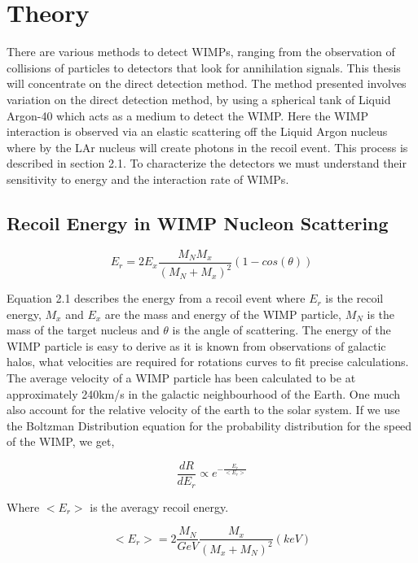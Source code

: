 \documentclass[11pt,a4paper,oneside]{report}
\begin{document}

\newpage
\chapter{Theory}

There are various methods to detect WIMPs, ranging from the observation of collisions of particles to detectors that look for   annihilation signals. This thesis will concentrate on the direct detection method. The method presented involves variation on the direct detection method, by using a spherical tank of Liquid Argon-40 which acts as a medium to detect the WIMP.  Here the WIMP interaction is observed via an elastic scattering off the Liquid Argon nucleus where by the LAr nucleus will create photons in the recoil event. This process is described in section 2.1. To characterize the detectors we must understand  their sensitivity to energy and the interaction rate of WIMPs. 

\section{Recoil Energy in WIMP Nucleon Scattering}

\begin{equation}
E_r = 2E_x\frac{M_NM_x}{(M_N +M_x)^2} (1 - cos(\theta))
\end{equation}

Equation 2.1 describes the energy from a recoil event where $E_{r}$ is the recoil energy, $M_x$ and $E_x$ are the mass and energy of the WIMP particle, $M_N$ is the mass of the target nucleus and $\theta$ is the angle of scattering. The energy of the WIMP particle is easy to derive as it is known from observations of galactic halos, what velocities are required for rotations curves to fit precise calculations. The average velocity of a WIMP particle has been calculated to be\cite{18} at approximately 240km/s in the galactic neighbourhood of the Earth. One much also account for the relative velocity of the earth to the solar system. If we use the Boltzman Distribution equation for the probability distribution for the speed of the WIMP, we get,

\begin{equation}
\frac{dR}{dE_r} \propto e^{-\frac{E_r}{<E_r>}}
\end{equation}

Where $<E_r>$ is the averagy recoil energy.

\begin{equation}
< E_r > = 2\frac{M_N}{GeV}\frac{M_x}{(M_x +M_N)^2}(keV)
\end{equation}
\end{document}
